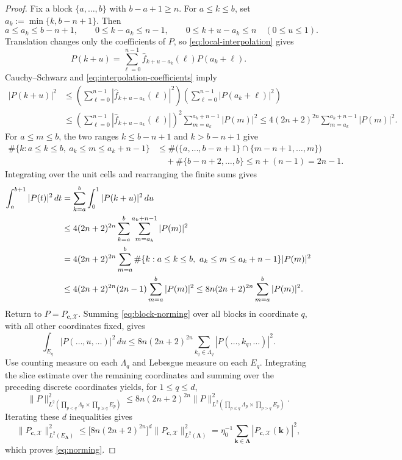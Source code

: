 \documentclass[11pt]{article}
\newcommand{\X}{\mathcal X}
\begin{document}
\begin{proof}
Fix a block $\{a,\ldots,b\}$ with $b-a+1\ge n$. For $a\le k\le b$, set $a_k:=\min\{k,b-n+1\}$. Then
\[
a\le a_k\le b-n+1,\qquad 0\le k-a_k\le n-1,\qquad 0\le k+u-a_k\le n\quad(0\le u\le1).
\]
Translation changes only the coefficients of $P$, so \eqref{eq:local-interpolation} gives
\[
P(k+u)=\sum_{\ell=0}^{n-1}\widehat f_{k+u-a_k}(\ell)P(a_k+\ell).
\]
Cauchy--Schwarz and \eqref{eq:interpolation-coefficients} imply
\begin{align*}
|P(k+u)|^2&\le\left(\sum_{\ell=0}^{n-1}|\widehat f_{k+u-a_k}(\ell)|^2\right)\left(\sum_{\ell=0}^{n-1}|P(a_k+\ell)|^2\right)\\
&\le\left(\sum_{\ell=0}^{n-1}|\widehat f_{k+u-a_k}(\ell)|\right)^2\sum_{m=a_k}^{a_k+n-1}|P(m)|^2\le4(2n+2)^{2n}\sum_{m=a_k}^{a_k+n-1}|P(m)|^2.
\end{align*}
For $a\le m\le b$, the two ranges $k\le b-n+1$ and $k>b-n+1$ give
\begin{align*}
\#\{k:a\le k\le b,\ a_k\le m\le a_k+n-1\}&\le\#\bigl(\{a,\ldots,b-n+1\}\cap\{m-n+1,\ldots,m\}\bigr)\\
&\quad+\#\{b-n+2,\ldots,b\}\le n+(n-1)=2n-1.
\end{align*}
Integrating over the unit cells and rearranging the finite sums gives
\begin{align}
\int_a^{b+1}|P(t)|^2\,dt&=\sum_{k=a}^b\int_0^1|P(k+u)|^2\,du\notag\\
&\le4(2n+2)^{2n}\sum_{k=a}^b\sum_{m=a_k}^{a_k+n-1}|P(m)|^2\notag\\
&=4(2n+2)^{2n}\sum_{m=a}^b\#\{k:a\le k\le b,\ a_k\le m\le a_k+n-1\}|P(m)|^2\notag\\
&\le4(2n+2)^{2n}(2n-1)\sum_{m=a}^b|P(m)|^2\le8n(2n+2)^{2n}\sum_{m=a}^b|P(m)|^2.\label{eq:block-norming}
\end{align}
Return to $P=P_{\bm c,\X}$. Summing \eqref{eq:block-norming} over all blocks in coordinate $q$, with all other coordinates fixed, gives
\[
\int_{E_q}|P(\ldots,u,\ldots)|^2\,du\le8n(2n+2)^{2n}\sum_{k_q\in\Lambda_q}|P(\ldots,k_q,\ldots)|^2.
\]
Use counting measure on each $\Lambda_q$ and Lebesgue measure on each $E_q$. Integrating the slice estimate over the remaining coordinates and summing over the preceding discrete coordinates yields, for $1\le q\le d$,
\[
\|P\|_{L^2(\prod_{p<q}\Lambda_p\times\prod_{p\ge q}E_p)}^2\le8n(2n+2)^{2n}\|P\|_{L^2(\prod_{p\le q}\Lambda_p\times\prod_{p>q}E_p)}^2.
\]
Iterating these $d$ inequalities gives
\[
\|P_{\bm c,\X}\|_{L^2(E_{\bm\Lambda})}^2\le\bigl[8n(2n+2)^{2n}\bigr]^d\|P_{\bm c,\X}\|_{L^2(\bm\Lambda)}^2=\eta_0^{-1}\sum_{\bm k\in\bm\Lambda}|P_{\bm c,\X}(\bm k)|^2,
\]
which proves \eqref{eq:norming}.
\end{proof}
\end{document}

